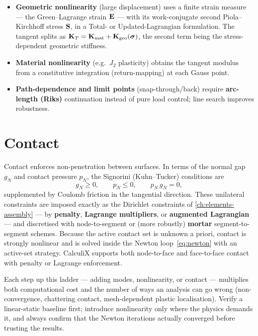 \begin{itemize}
  \item \textbf{Geometric nonlinearity} (large displacement) uses a
        finite strain measure --- the Green--Lagrange strain $\mathbf{E}$ ---
        with its work-conjugate second Piola--Kirchhoff stress $\mathbf{S}$,
        in a Total- or Updated-Lagrangian formulation. The tangent
        splits as $\mathbf{K}_T=\mathbf{K}_{\mathrm{mat}}+\mathbf{K}_{\mathrm{geo}}(\bm{\sigma})$,
        the second term being the stress-dependent geometric stiffness.
  \item \textbf{Material nonlinearity} (e.g.\ $J_2$ plasticity) obtains
        the tangent modulus from a constitutive integration
        (return-mapping) at each Gauss point.
  \item \textbf{Path-dependence and limit points} (snap-through/back)
        require \textbf{arc-length (Riks)} continuation instead of pure
        load control; line search improves robustness.
\end{itemize}

\section{Contact}

Contact enforces non-penetration between surfaces. In terms of the normal
gap $g_N$ and contact pressure $p_N$, the Signorini (Kuhn--Tucker)
conditions are
\begin{equation}
  g_N \ge 0, \qquad p_N \le 0, \qquad p_N\,g_N = 0,
\end{equation}
supplemented by Coulomb friction in the tangential direction. These
unilateral constraints are imposed exactly as the Dirichlet constraints
of \cref{ch:elements-assembly} --- by \textbf{penalty}, \textbf{Lagrange
multipliers}, or \textbf{augmented Lagrangian} --- and discretised with
node-to-segment or (more robustly) \textbf{mortar} segment-to-segment
schemes. Because the active contact set is unknown a priori, contact is
strongly nonlinear and is solved inside the Newton loop~\eqref{eq:newton}
with an active-set strategy. CalculiX supports both node-to-face and
face-to-face contact with penalty or Lagrange enforcement.

\begin{remark}
Each step up this ladder --- adding modes, nonlinearity, or contact ---
multiplies both computational cost and the number of ways an analysis can
go wrong (non-convergence, chattering contact, mesh-dependent plastic
localisation). Verify a linear-static baseline first; introduce
nonlinearity only where the physics demands it, and always confirm that
the Newton iterations actually converged before trusting the results.
\end{remark}
